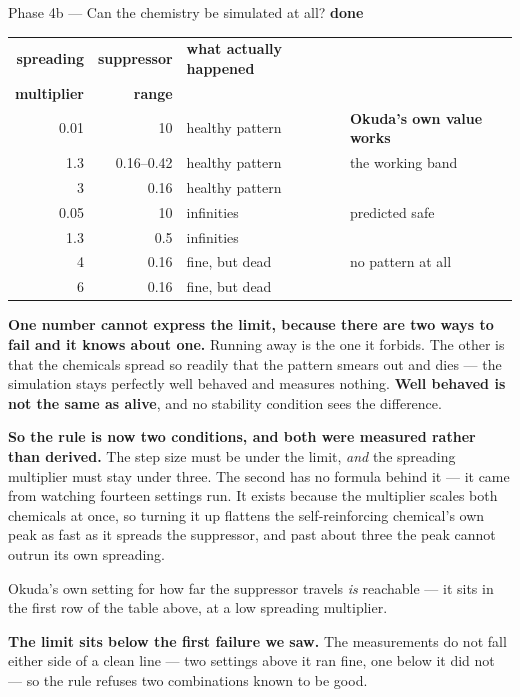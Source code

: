 \documentclass[11pt,a4paper]{article}
\newcommand{\dn}{\textcolor{good}{\textbf{done}}}
\begin{document}
\begin{phasebox}{Phase 4b --- Can the chemistry be simulated at all? \hfill \dn}
\begin{center}\small
\begin{tabular}{@{}r r l l@{}}
\toprule
\textbf{spreading} & \textbf{suppressor} & \textbf{what actually happened} & \\
\textbf{multiplier} & \textbf{range} & & \\
\midrule
0.01 & 10   & healthy pattern & \textbf{Okuda's own value works}\\
1.3  & 0.16--0.42 & healthy pattern & the working band\\
3    & 0.16 & healthy pattern & \\
\midrule
0.05 & 10   & \textcolor{bad}{infinities} & predicted safe\\
1.3  & 0.5  & \textcolor{bad}{infinities} & \\
4    & 0.16 & \textcolor{warn}{fine, but dead} & no pattern at all\\
6    & 0.16 & \textcolor{warn}{fine, but dead} & \\
\bottomrule
\end{tabular}
\end{center}

\textbf{One number cannot express the limit, because there are two ways to fail and it knows
about one.} Running away is the one it forbids. The other is that the chemicals spread so readily
that the pattern smears out and dies --- the simulation stays perfectly well behaved and measures
nothing. \textbf{Well behaved is not the same as alive}, and no stability condition sees the
difference.

\textbf{So the rule is now two conditions, and both were measured rather than derived.} The step
size must be under the limit, \emph{and} the spreading multiplier must stay under three. The second
has no formula behind it --- it came from watching fourteen settings run. It exists because the
multiplier scales both chemicals at once, so turning it up flattens the self-reinforcing chemical's
own peak as fast as it spreads the suppressor, and past about three the peak cannot outrun its own
spreading.

Okuda's own setting for how far the suppressor travels \emph{is} reachable --- it sits in the first
row of the table above, at a low spreading multiplier.

\textbf{The limit sits below the first failure we saw.} The measurements do not fall either side of
a clean line --- two settings above it ran fine, one below it did not --- so the rule refuses two
combinations known to be good.


\end{phasebox}
\end{document}

